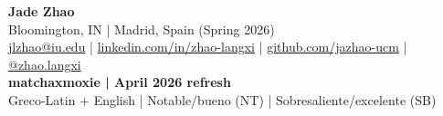 
\begin{center}
    {\LARGE \textbf{Jade Zhao}}\\
    \vspace{0.2em}
    {\small Bloomington, IN \;|\; Madrid, Spain (Spring 2026)}\\
    \vspace{0.2em}
    {\small
      \href{mailto:jlzhao@iu.edu}{jlzhao@iu.edu}
      \;|\;
      \href{https://www.linkedin.com/in/zhao-langxi/}{linkedin.com/in/zhao-langxi}
      \;|\;
      \href{https://github.com/jazhao-ucm}{github.com/jazhao-ucm}
      \;|\;
      \href{https://instagram.com/zhao.langxi}{@zhao.langxi}
    }\\
    \vspace{0.2em}
    {\small\textbf{matchaxmoxie \;|\; April 2026 refresh}}\\
    {\small Greco-Latin + English \;|\; Notable/bueno (NT) \;|\; Sobresaliente/excelente (SB)}
\end{center}

